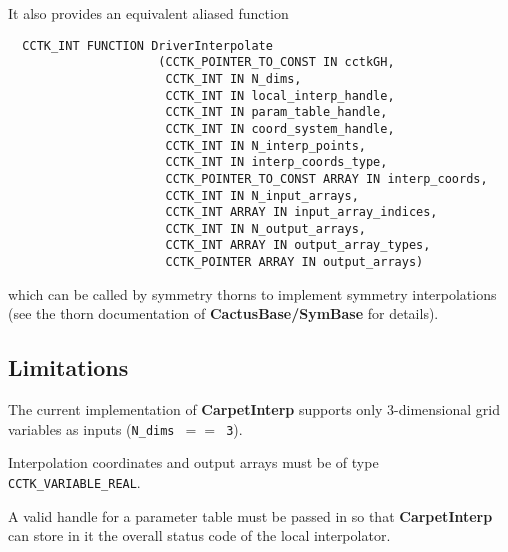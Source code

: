It also provides an equivalent aliased function
\begin{verbatim}
  CCTK_INT FUNCTION DriverInterpolate
                     (CCTK_POINTER_TO_CONST IN cctkGH,
                      CCTK_INT IN N_dims,
                      CCTK_INT IN local_interp_handle,
                      CCTK_INT IN param_table_handle,
                      CCTK_INT IN coord_system_handle,
                      CCTK_INT IN N_interp_points,
                      CCTK_INT IN interp_coords_type,
                      CCTK_POINTER_TO_CONST ARRAY IN interp_coords,
                      CCTK_INT IN N_input_arrays,
                      CCTK_INT ARRAY IN input_array_indices,
                      CCTK_INT IN N_output_arrays,
                      CCTK_INT ARRAY IN output_array_types,
                      CCTK_POINTER ARRAY IN output_arrays)
\end{verbatim}
which can be called by symmetry thorns to implement symmetry interpolations
(see the thorn documentation of {\bf CactusBase/SymBase} for details).


\subsection{Limitations}

The current implementation of {\bf CarpetInterp} supports only 3-dimensional
grid variables as inputs ({\tt N\_dims $==$ 3}).

Interpolation coordinates and output arrays must be of type
{\tt CCTK\_VARIABLE\_REAL}.

A valid handle for a parameter table must be passed in so that {\bf CarpetInterp}
can store in it the overall status code of the local interpolator.




